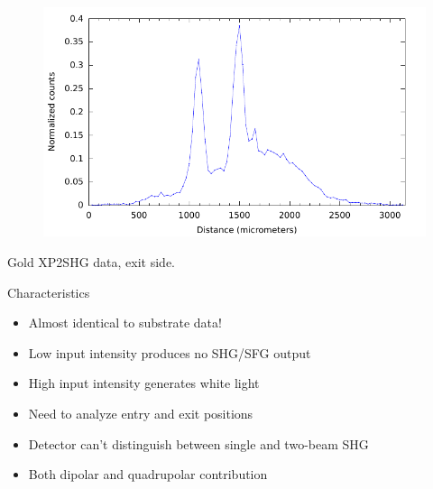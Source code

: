 \documentclass{beamer}
\begin{document}
\begin{frame}
\begin{figure}
\centering
\includegraphics[width=\textwidth]{au_shg_whitelight}
\end{figure}
\begin{center}
Gold XP2SHG data, exit side.
\end{center}
\end{frame}

\begin{frame}
\begin{block}{Characteristics}
\begin{itemize}
\item Almost identical to substrate data!
\item Low input intensity produces no SHG/SFG output
\item High input intensity generates white light
\item Need to analyze entry and exit positions
\item Detector can't distinguish between single and two-beam SHG
\item Both dipolar and quadrupolar contribution
\end{itemize}
\end{block}
\end{frame}
\end{document}
